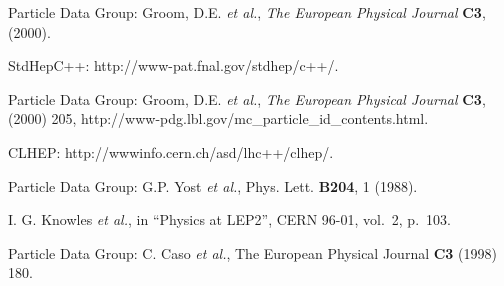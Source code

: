 
\def\etal{{\it et al.}}

\begin{thebibliography}{9}

Particle Data Group: Groom, D.E.  \etal, \emph{The European Physical Journal} \textbf{C3}, (2000). 

StdHepC++: http://www-pat.fnal.gov/stdhep/c++/. 

Particle Data Group: Groom, D.E.  \etal, \emph{The European Physical Journal} \textbf{C3}, (2000) 205, 
\newline
http://www-pdg.lbl.gov/mc\_particle\_id\_contents.html. 

CLHEP:  http://wwwinfo.cern.ch/asd/lhc++/clhep/.

Particle Data Group: G.P. Yost \etal, Phys. Lett. {\bf B204}, 1 (1988).

I. G. Knowles \etal, in ``Physics at LEP2'', CERN 96-01, vol.~2, p.~103.

Particle Data Group: C. Caso \etal, The European Physical Journal {\bf C3} (1998) 180. 

\end{thebibliography}
\newpage

